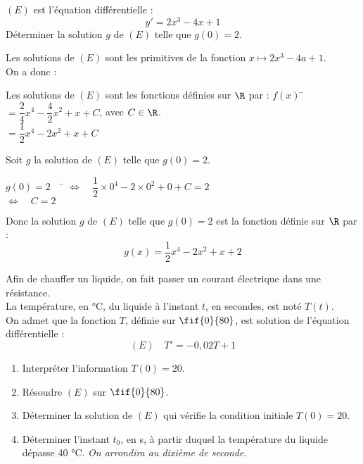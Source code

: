\documentclass[a4paper,11pt,exos]{nsi}
\begin{document}
\exo{}
$(E)$ est l'équation différentielle  : 
$$y'=2x^3-4x+1$$
Déterminer la solution $g$ de $(E)$ telle que $g(0)=2$.\\

\textcolor{UGLiBlue}{
    Les solutions de $(E)$ sont les primitives de la fonction $x\mapsto 2x^3-4a+1$.\\
    On a donc :
    \begin{tabbing}
        Les solutions de $(E)$ sont les fonctions définies sur $\R$ par :
    $f(x)$ \=$= \dfrac{2}{4}x^4 - \dfrac{4}{2}x^2 + x + C$, avec $C \in \R$.\\[.5em]
        \> $= \dfrac{1}{2}x^4 - 2x^2 + x + C$
    \end{tabbing}
    Soit $g$ la solution de $(E)$ telle que $g(0)=2$.\\
    \begin{tabbing}
        $g(0)=2 \quad$ \= $\iff\quad \dfrac{1}{2}\times 0^4 - 2 \times 0^2 + 0 + C = 2$\\
        \> $\iff\quad C = 2$
    \end{tabbing}
    Donc la solution $g$ de $(E)$ telle que $g(0)=2$ est la fonction définie sur $\R$ par :
    $$g(x) = \dfrac{1}{2}x^4 - 2x^2 + x + 2$$
}

\exo{}
Afin de chauffer un liquide, on fait passer un courant électrique dans une résistance.\\
La température, en °C, du liquide à l'instant $t$, en secondes, est noté $T(t)$.\\
On admet que la fonction $T$, définie sur $\fif{0}{80}$, est solution de l'équation différentielle :
$$(E) \quad T'=-0{,}02T+1$$
\begin{enumerate}
    \item Interpréter l'information $T(0)=20$.
    \item Résoudre $(E)$ sur $\fif{0}{80}$.
    \item Déterminer la solution de $(E)$ qui vérifie la condition initiale $T(0)=20$.
    \item Déterminer l'instant $t_0$, en s, à partir duquel la température du liquide dépasse 40 °C. \textit{On arrondira au dixième de seconde.}
\end{enumerate}
\end{document}
